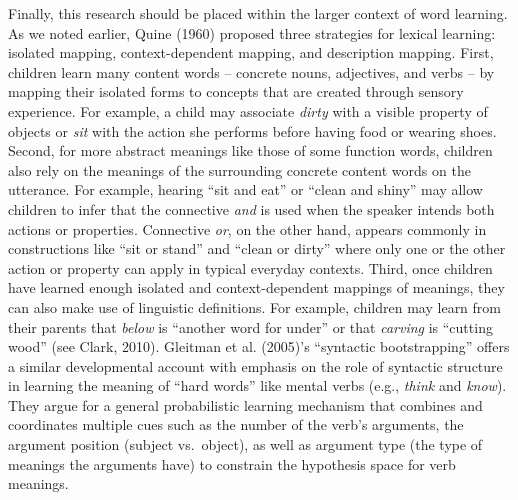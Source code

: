 \documentclass[
  ,man,floatsintext]{apa6}
\begin{document}
Finally, this research should be placed within the larger context of word learning. As we noted earlier, Quine (1960) proposed three strategies for lexical learning: isolated mapping, context-dependent mapping, and description mapping. First, children learn many content words -- concrete nouns, adjectives, and verbs -- by mapping their isolated forms to concepts that are created through sensory experience. For example, a child may associate \emph{dirty} with a visible property of objects or \emph{sit} with the action she performs before having food or wearing shoes. Second, for more abstract meanings like those of some function words, children also rely on the meanings of the surrounding concrete content words on the utterance. For example, hearing ``sit and eat'' or ``clean and shiny'' may allow children to infer that the connective \emph{and} is used when the speaker intends both actions or properties. Connective \emph{or}, on the other hand, appears commonly in constructions like ``sit or stand'' and ``clean or dirty'' where only one or the other action or property can apply in typical everyday contexts. Third, once children have learned enough isolated and context-dependent mappings of meanings, they can also make use of linguistic definitions. For example, children may learn from their parents that \emph{below} is ``another word for under'' or that \emph{carving} is ``cutting wood'' (see Clark, 2010). Gleitman et al. (2005)'s ``syntactic bootstrapping'' offers a similar developmental account with emphasis on the role of syntactic structure in learning the meaning of ``hard words'' like mental verbs (e.g., \emph{think} and \emph{know}). They argue for a general probabilistic learning mechanism that combines and coordinates multiple cues such as the number of the verb's arguments, the argument position (subject vs.~object), as well as argument type (the type of meanings the arguments have) to constrain the hypothesis space for verb meanings.
\end{document}

